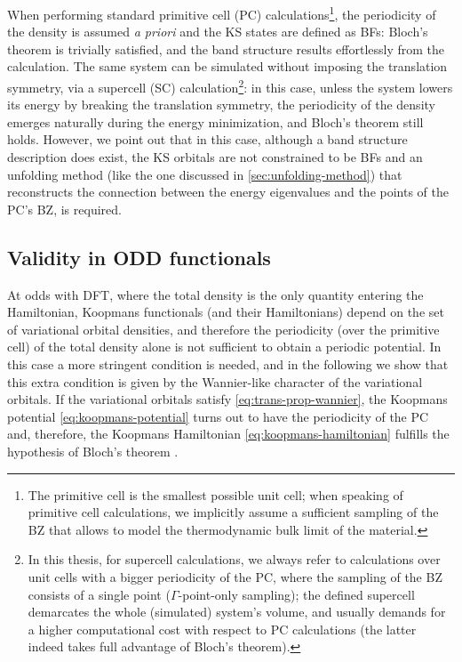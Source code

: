When performing standard primitive cell (PC) calculations\footnote{The primitive cell is the smallest possible unit cell; when speaking of primitive cell calculations, we implicitly assume a sufficient sampling of the BZ that allows to model the thermodynamic bulk limit of the material.}, the periodicity of the density is assumed \emph{a priori} and the KS states are defined as BFs: Bloch's theorem is trivially satisfied, and the band structure results effortlessly from the calculation. The same system can be simulated without imposing the translation symmetry, via a supercell (SC) calculation\footnote{In this thesis, for supercell calculations, we always refer to calculations over unit cells with a bigger periodicity of the PC, where the sampling of the BZ consists of a single point ($\Gamma$-point-only sampling); the defined supercell demarcates the whole (simulated) system's volume, and usually demands for a higher computational cost with respect to PC calculations (the latter indeed takes full advantage of Bloch's theorem).}: in this case, unless the system lowers its energy by breaking the translation symmetry, the periodicity of the density emerges naturally during the energy minimization, and Bloch's theorem still holds. However, we point out that in this case, although a band structure description does exist, the KS orbitals are not constrained to be BFs and an unfolding method (like the one discussed in \cref{sec:unfolding-method}) that reconstructs the connection between the energy eigenvalues and the points of the PC's BZ, is required.

\subsection{Validity in ODD functionals\label{sec:bloch-th-odd}}
At odds with DFT, where the total density is the only quantity entering the Hamiltonian, Koopmans functionals (and their Hamiltonians) depend on the set of variational orbital densities, and therefore the periodicity (over the primitive cell) of the total density alone is not sufficient to obtain a periodic potential. In this case a more stringent condition is needed, and in the following we show that this extra condition is given by the Wannier-like character of the variational orbitals. If the variational orbitals satisfy \cref{eq:trans-prop-wannier}, the Koopmans potential \eqref{eq:koopmans-potential} turns out to have the periodicity of the PC and, therefore, the Koopmans Hamiltonian \eqref{eq:koopmans-hamiltonian} fulfills the hypothesis of Bloch's theorem \cite{de_gennaro_blochs_2022}.

